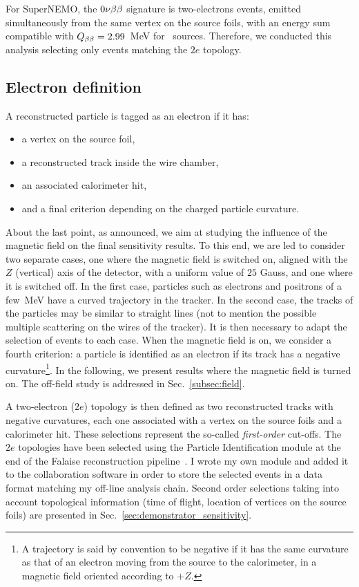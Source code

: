 For SuperNEMO, the $0\nu\beta\beta$ signature is two-electrons events, emitted simultaneously from the same vertex on the source foils, with an energy sum compatible with $Q_{\beta\beta} = 2.99$~MeV for \Se\ sources.
Therefore, we conducted this analysis selecting only events matching the $2e$ topology.

\subsection{Electron definition}

A reconstructed particle is tagged as an electron if it has:
\begin{itemize}
\item a vertex on the source foil,
\item a reconstructed track inside the wire chamber,
\item an associated calorimeter hit,
\item and a final criterion depending on the charged particle curvature.
\end{itemize}
About the last point, as announced, we aim at studying the influence of the magnetic field on the final sensitivity results.
To this end, we are led to consider two separate cases, one where the magnetic field is switched on, aligned with the $Z$ (vertical) axis of the detector, with a uniform value of $25$ Gauss, and one where it is switched off.
In the first case, particles such as electrons and positrons of a few~MeV have a curved trajectory in the tracker.
In the second case, the tracks of the particles may be similar to straight lines (not to mention the possible multiple scattering on the wires of the tracker).
It is then necessary to adapt the selection of events to each case.
When the magnetic field is on, we consider a fourth criterion: a particle is identified as an electron if its track has a negative curvature\footnote{A trajectory is said by convention to be negative if it has the same curvature as that of an electron moving from the source to the calorimeter, in a magnetic field oriented according to $+Z$.}.
In the following, we present results where the magnetic field is turned on.
The off-field study is addressed in Sec.~\ref{subsec:field}.

A two-electron ($2e$) topology is then defined as two reconstructed tracks with negative curvatures, each one associated with a vertex on the source foils and a calorimeter hit.
These selections represent the so-called \emph{first-order} cut-offs.
The $2e$ topologies have been selected using the Particle Identification module at the end of the Falaise reconstruction pipeline~\cite{CalvezThesis}.
I wrote my own module and added it to the collaboration software in order to store the selected events in a data format matching my off-line analysis chain.
Second order selections taking into account topological information (time of flight, location of vertices on the source foils) are presented in Sec.~\ref{sec:demonstrator_sensitivity}.

